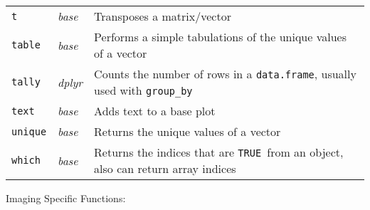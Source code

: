 \documentclass[10pt]{article}
\newcommand{\code}[1]{\texttt{#1}}
\newcommand{\pkg}[1]{\emph{#1}}
\newcommand{\TRUE}{\texttt{TRUE }}
\begin{document}
\begin{longtable}{p{1.5in}p{1in}p{5in}}
\code{t} & \pkg{base} & Transposes a matrix/vector \\
\code{table} & \pkg{base} & Performs a simple tabulations of the unique values of a vector\\
\code{tally} & \pkg{dplyr} & Counts the number of rows in a \code{data.frame}, usually used with \code{group\_by} \\
\code{text} & \pkg{base} & Adds text to a base plot \\
\code{unique} & \pkg{base} & Returns the unique values of a vector \\
\code{which} & \pkg{base} & Returns the indices that are \TRUE from an object, also can return array indices \\ \hline
\end{longtable}

\clearpage 

Imaging Specific Functions:
\end{document}
